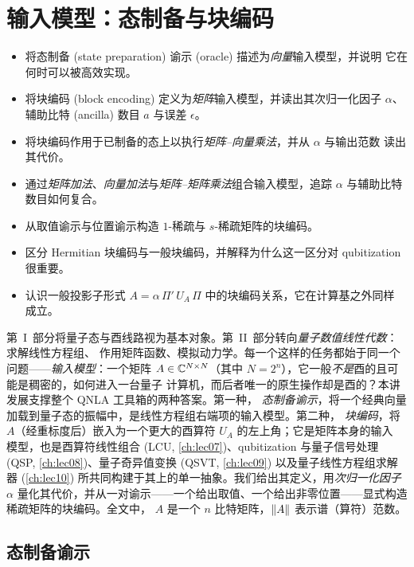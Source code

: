 \chapter{输入模型：态制备与块编码}
\label{ch:lec06}

\begin{objectives}
\begin{itemize}[leftmargin=1.4em,nosep]
  \item 将态制备 (state preparation) 谕示 (oracle) 描述为\emph{向量}输入模型，并说明
        它在何时可以被高效实现。
  \item 将块编码 (block encoding) 定义为\emph{矩阵}输入模型，并读出其次归一化因子
        $\alpha$、辅助比特 (ancilla) 数目 $a$ 与误差 $\epsilon$。
  \item 将块编码作用于已制备的态上以执行\emph{矩阵--向量乘法}，并从 $\alpha$ 与输出范数
        读出其代价。
  \item 通过\emph{矩阵加法}、\emph{向量加法}与\emph{矩阵--矩阵乘法}组合输入模型，追踪
        $\alpha$ 与辅助比特数目如何复合。
  \item 从取值谕示与位置谕示构造 $1$-稀疏与 $s$-稀疏矩阵的块编码。
  \item 区分 Hermitian 块编码与一般块编码，并解释为什么这一区分对 qubitization 很重要。
  \item 认识一般投影子形式 $A=\alpha\,\Pi'\,U_A\,\Pi$ 中的块编码关系，它在计算基之外同样
        成立。
\end{itemize}
\end{objectives}

第~I~部分将量子态与酉线路视为基本对象。第~II~部分转向\emph{量子数值线性代数}：求解线性方程组、
作用矩阵函数、模拟动力学。每一个这样的任务都始于同一个问题——\emph{输入模型}：一个矩阵
$A\in\mathbb{C}^{N\times N}$（其中 $N=2^n$），它一般\emph{不是}酉的且可能是稠密的，如何进入一台量子
计算机，而后者唯一的原生操作却是酉的？本讲发展支撑整个 QNLA 工具箱的两种答案。第一种，
\emph{态制备谕示}，将一个经典向量加载到量子态的振幅中，是线性方程组右端项的输入模型。第二种，
\emph{块编码}，将 $A$（经重标度后）嵌入为一个更大的酉算符 $U_A$ 的左上角；它是矩阵本身的输入
模型，也是酉算符线性组合 (LCU, \cref{ch:lec07})、qubitization 与量子信号处理
(QSP, \cref{ch:lec08})、量子奇异值变换 (QSVT, \cref{ch:lec09}) 以及量子线性方程组求解器
(\cref{ch:lec10}) 所共同构建于其上的单一抽象。我们给出其定义，用\emph{次归一化因子} $\alpha$
量化其代价，并从一对谕示——一个给出取值、一个给出非零位置——显式构造稀疏矩阵的块编码。全文中，
$A$ 是一个 $n$ 比特矩阵，$\left\lVert A \right\rVert$ 表示谱（算符）范数。

\section{态制备谕示}
\label{sec:lec06-1}

